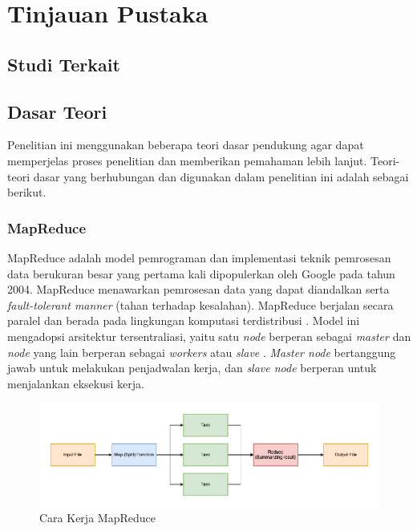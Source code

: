 \chapter{Tinjauan Pustaka}

\section{Studi Terkait}
\blindtext

\section{Dasar Teori}
Penelitian ini menggunakan beberapa teori dasar pendukung agar dapat memperjelas proses penelitian dan memberikan pemahaman lebih lanjut. Teori-teori dasar yang berhubungan dan digunakan dalam penelitian ini adalah sebagai berikut.
\subsection{MapReduce}
MapReduce adalah model pemrograman dan implementasi teknik pemrosesan data berukuran besar yang pertama kali dipopulerkan oleh Google pada tahun 2004\cite{kaliaAnalysisHadoopMapReduce2021}. MapReduce menawarkan pemrosesan data yang dapat diandalkan serta \textit{fault-tolerant manner} (tahan terhadap kesalahan).  MapReduce berjalan secara paralel dan berada pada lingkungan komputasi terdistribusi \cite{cTaskFailureResilience2020}. Model ini mengadopsi arsitektur tersentraliasi, yaitu satu \textit{node} berperan sebagai \textit{master} dan \textit{node} yang lain berperan sebagai \textit{workers} atau \textit{slave} \cite{herodotouHadoopPerformanceModels2011, bakratsasHadoopMapReducePerformance2018}. \textit{Master node} bertanggung jawab untuk melakukan penjadwalan kerja, dan \textit{slave node} berperan untuk menjalankan eksekusi kerja. 

\begin{figure}[h!]
    \centering
    \includegraphics[width=1\textwidth]{figures/ch02/mapreduce-scheme.png}
    \caption{Cara Kerja MapReduce}
    \label{fig:mapreduce-flow}
\end{figure}

